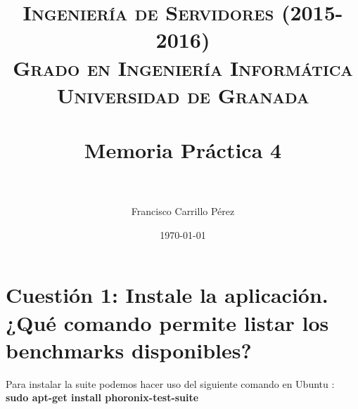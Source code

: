 

\title{	
\normalfont \normalsize 
\textsc{{\bf Ingeniería de Servidores (2015-2016)} \\ Grado en Ingeniería Informática \\ Universidad de Granada} \\ [25pt] %
\horrule{0.5pt} \\[0.4cm] %
\huge Memoria Práctica 4 \\ %
\horrule{2pt} \\[0.5cm] %
}

\author{Francisco Carrillo Pérez} %

\date{\normalsize\today} %




\maketitle %

\newpage %

\tableofcontents %

\listoffigures

\listoftables

\newpage


\section{Cuestión 1: Instale la aplicación. ¿Qué comando permite listar los benchmarks disponibles?}

Para instalar la suite podemos hacer uso del siguiente comando en Ubuntu \cite{phoronix-suite}:\\
\textbf{sudo apt-get install phoronix-test-suite}\\

